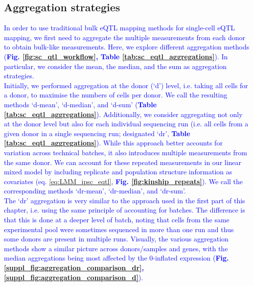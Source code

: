 

\newpage

\subsection{Aggregation strategies}


\textcolor{blue}{In order to use traditional bulk eQTL mapping methods for single-cell eQTL mapping, we first need to aggregate the multiple measurements from each donor to obtain bulk-like
measurements. 
Here, we explore different aggregation methods (\textbf{Fig. \ref{fig:sc_qtl_workflow}, Table \ref{tab:sc_eqtl_aggregations}}). 
In particular, we consider the mean, the median, and the sum as aggregation strategies.} \\

\textcolor{blue}{Initially, we performed aggregation at the donor (`d') level, i.e. taking all cells for a donor, to maximise the numbers of
cells per donor. 
We call the resulting methods `d-mean', `d-median', and `d-sum' (\textbf{Table \ref{tab:sc_eqtl_aggregations}}).
Additionally, 
we consider aggregating not only at the donor level but also for each individual sequencing run (i.e. all cells from a given donor in a single sequencing run; designated `dr', \textbf{Table \ref{tab:sc_eqtl_aggregations}}). 
While this approach better accounts for variation across technical batches, it also introduces multiple measurements from the same donor. 
We can account for these repeated measurements in our linear mixed model by including replicate and population structure
information as covariates (eq. \eqref{eq:LMM_ipsc_eqtl}, \textbf{Fig. \ref{fig:kinship_repeats}}). 
We call the corresponding methods `dr-mean', `dr-median',
and `dr-sum'.} \\


\textcolor{blue}{The `dr' aggregation is very similar to the approach used in the first part of this chapter, i.e. using the same principle of accounting for batches.
The difference is that this is done at a deeper level of batch, noting that cells from the same experimental pool were sometimes sequenced in more than one run and thus some donors are present in multiple runs. 
Visually, the various aggregation methods show a similar picture across donors/samples and genes, with the median aggregations being most affected by the 0-inflated expression (\textbf{Fig. \ref{suppl_fig:aggregation_comparison_dr}, \ref{suppl_fig:aggregation_comparison_d}}).} \\

